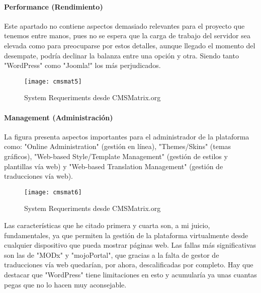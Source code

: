 \paragraph{Performance (Rendimiento)}

\par Este apartado no contiene aspectos demasiado relevantes para el proyecto que tenemos entre manos, pues no se espera que la carga de trabajo del servidor sea elevada como para preocuparse por estos detalles, aunque llegado el momento del desempate, podría declinar la balanza entre una opción y otra. Siendo tanto "WordPress" como "Joomla!" los más perjudicados.

\begin{figure}
\begin{narrow}{-0.2\linewidth}{-0.2\linewidth}
\centering
\texttt{[image: cmsmat5]}
\caption{System Requeriments desde CMSMatrix.org}
\end{narrow}
\label{fig:cmsmat1}
\end{figure}


\paragraph{Management (Administración)}

\par La figura presenta aspectos importantes para el administrador de la plataforma como: "Online Administration" (gestión en línea), "Themes/Skins" (temas gráficos), "Web-based Style/Template Management" (gestión de estilos y plantillas vía web) y "Web-based Translation Management" (gestión de traducciones vía web).

\begin{figure}
\begin{narrow}{-0.2\linewidth}{-0.2\linewidth}
\centering
\texttt{[image: cmsmat6]}
\caption{System Requeriments desde CMSMatrix.org}
\end{narrow}
\label{fig:cmsmat1}
\end{figure}

\par Las características que he citado primera y cuarta son, a mi juicio, fundamentales, ya que permiten la gestión de la plataforma virtualmente desde cualquier dispositivo que pueda mostrar páginas web. Las fallas más significativas son las de "MODx" y "mojoPortal", que gracias a la falta de gestor de traducciones vía web quedarían, por ahora, descalificadas por completo. Hay que destacar que "WordPress" tiene limitaciones en esto y acumularía ya unas cuantas pegas que no lo hacen muy aconsejable.


